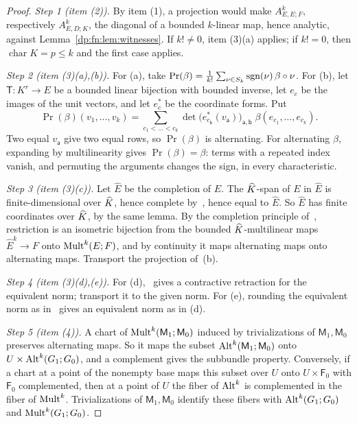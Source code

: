 \begin{proof}
\emph{Step 1 (item (2)).} By item (1), a projection would make $A^k_{E,E;F}$, respectively $A^k_{E,D;K}$, the diagonal of a bounded $k$\nobreakdash-linear map, hence analytic, against Lemma~\ref{dp:fn:lem:witnesses}. If $k!\ne0$, item (3)(a) applies; if $k!=0$, then $\operatorname{char}K=p\le k$ and the first case applies.

\emph{Step 2 (item (3)(a),(b)).} For (a), take $\operatorname{Pr}(\beta)=\frac1{k!}\sum_{\nu\in S_k}\operatorname{sgn}(\nu)\,\beta\circ\nu$. For (b), let $\mathsf T\colon K^r\to E$ be a bounded linear bijection with bounded inverse, let $e_c$ be the images of the unit vectors, and let $e^*_c$ be the coordinate forms. Put
\[
 \operatorname{Pr}(\beta)(v_1,\dots,v_k)=\sum_{c_1<\dots<c_k}\det\bigl(e^*_{c_{\mathsf b}}(v_{\mathsf a})\bigr)_{\mathsf a,\mathsf b}\;\beta(e_{c_1},\dots,e_{c_k}).
\]
Two equal $v_{\mathsf a}$ give two equal rows, so $\operatorname{Pr}(\beta)$ is alternating. For alternating $\beta$, expanding by multilinearity gives $\operatorname{Pr}(\beta)=\beta$: terms with a repeated index vanish, and permuting the arguments changes the sign, in every characteristic.

\emph{Step 3 (item (3)(c)).} Let $\widehat E$ be the completion of $E$. The $\widehat K$-span of $E$ in $\widehat E$ is finite-dimensional over $\widehat K$, hence complete by~\cite[Lemma~A.3]{I}, hence equal to $\widehat E$. So $\widehat E$ has finite coordinates over $\widehat K$, by the same lemma. By the completion principle of~\cite[text before Lemma~H.5]{I}, restriction is an isometric bijection from the bounded $\widehat K$-multilinear maps $\widehat E^k\to F$ onto $\operatorname{Mult}^k(E;F)$, and by continuity it maps alternating maps onto alternating maps. Transport the projection of~(b).

\emph{Step 4 (item (3)(d),(e)).} For (d),~\cite[Theorem~5.2]{I} gives a contractive retraction for the equivalent norm; transport it to the given norm. For (e), rounding the equivalent norm as in~\cite[proof of Corollary~5.3]{I} gives an equivalent norm as in (d).

\emph{Step 5 (item (4)).} A chart of $\operatorname{Mult}^k(\mathsf M_1;\mathsf M_0)$ induced by trivializations of $\mathsf M_1,\mathsf M_0$ preserves alternating maps. So it maps the subset $\operatorname{Alt}^k(\mathsf M_1;\mathsf M_0)$ onto $U\times\operatorname{Alt}^k(G_1;G_0)$, and a complement gives the subbundle property. Conversely, if a chart at a point of the nonempty base maps this subset over $U$ onto $U\times\mathsf F_0$ with $\mathsf F_0$ complemented, then at a point of $U$ the fiber of $\operatorname{Alt}^k$ is complemented in the fiber of $\operatorname{Mult}^k$. Trivializations of $\mathsf M_1,\mathsf M_0$ identify these fibers with $\operatorname{Alt}^k(G_1;G_0)$ and $\operatorname{Mult}^k(G_1;G_0)$.
\end{proof}

